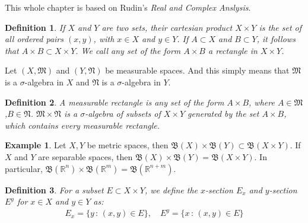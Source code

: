 \documentclass[11pt]{book}
\newtheorem{definition}{Definition}[chapter]
\theoremstyle{definition}
\newtheorem{example}{Example}[chapter]
\numberwithin{equation}{chapter}
\begin{document}
This whole chapter is based on Rudin's {\em Real and Complex Anslysis}\cite{2}. 

\medskip

\begin{definition}
If $X$ and $Y$ are two sets, their cartesian product $X \times Y$ is the set of all ordered pairs $(x, y)$, with $x \in X$ and $y \in Y$. If $A \subset X$ and $B \subset Y$, it follows that $A \times B \subset X \times Y$. We call any set of the form $A \times B$ a rectangle in $X \times Y$.
\end{definition}

\medskip

Let $(X,\mathfrak{M})$ and $(Y,\mathfrak{N})$ be measurable spaces. And this simply means that $\mathfrak{M}$ is a $\sigma$-algebra in $X$ and $\mathfrak{N}$ is a $\sigma$-algebra in $Y$.

\medskip

\begin{definition}
A measurable rectangle is any set of the form $A \times B$, where $A \in \mathfrak{M}$,$B \in \mathfrak{N}$.  $\mathfrak{M} \times \mathfrak{N}$ is a $\sigma$-algebra of subsets of $X \times Y$ generated by the set $A \times B$, which contains every measurable rectangle.
\end{definition}

\medskip

\begin{example}
Let $X,Y$ be metric spaces, then $\mathfrak{B}(X) \times \mathfrak{B}(Y) \subset \mathfrak{B}(X \times Y)$. If $X$ and $Y$ are separable spaces, then $\mathfrak{B}(X) \times \mathfrak{B}(Y) = \mathfrak{B}(X \times Y)$. In particular, $\mathfrak{B}(\mathbb{R}^n) \times \mathfrak{B}(\mathbb{R}^m) = \mathfrak{B}(\mathbb{R}^{n+m})$.
\end{example}

\medskip

\begin{definition}
For a subset $E \subset X \times Y$, we define the $x$-section $E_x$ and $y$-section $E^y$ for $x \in X$ and $y \in Y$ as:
\begin{align*}
    E_x = \{y \,:\, (x,y) \in E\}, \quad E^y = \{x \,:\, (x,y) \in E\}
\end{align*}
\end{definition}

\medskip
\end{document}
